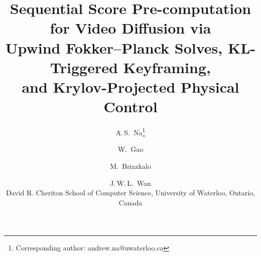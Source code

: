 

\title{Sequential Score Pre-computation for Video Diffusion via\\
       Upwind Fokker--Planck Solves, KL-Triggered Keyframing,\\
       and Krylov-Projected Physical Control}
\author{%
  A.\,S.~Na\thanks{Corresponding author: andrew.na@uwaterloo.ca} \and
  W.~Gao \and M.~Briazkalo \and J.\,W.\,L.~Wan\\
  \normalsize David R. Cheriton School of Computer Science,
  University of Waterloo, Ontario, Canada}
\date{}



\maketitle

